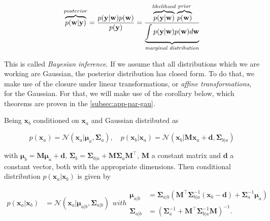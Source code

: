 \documentclass[11pt]{article} %
\begin{document}
\begin{equation}
   \overbrace{p(\mathbf{w}|\mathbf{y})}^{posterior} = \frac{p(\mathbf{y}|\mathbf{w}) p(\mathbf{w})}{p(\mathbf{y})} = \frac{\overbrace{p(\mathbf{y}|\mathbf{w})}^{\text{\textit{likelihood}}} \overbrace{p(\mathbf{w})}^{\text{\textit{prior}}}}{\underbrace{\int p(\mathbf{y}|\mathbf{w}) p(\mathbf{w}) d\mathbf{w}}_{\text{\textit{marginal distribution}}}}
\end{equation}

This is called \textit{Bayesian inference}. If we assume that all distributions which we are working are Gaussian, the posterior distribution has closed form. To do that, we make use of the closure under linear transformations, or \textit{affine transformations}, for the Gaussian. For that, we will make use of the corollary below, which theorems are proven in the \autoref{subsec:app-par-gau}.

\begin{corollary}

   Being $\mathbf{x}_b$ conditioned on $\mathbf{x}_a$ and Gaussian distributed as

   \begin{equation}
     p\left(\mathbf{x}_{a}\right)=\mathcal{N}\left(\mathbf{x}_{a} | \boldsymbol{\mu}_{a}, \boldsymbol{\Sigma}_{a}\right), \quad p\left(\mathbf{x}_{b} | \mathbf{x}_{a}\right)=\mathcal{N}\left(\mathbf{x}_{b} | \mathbf{M} \mathbf{x}_{a}+\mathbf{d}, \boldsymbol{\Sigma}_{b | a}\right)
   \end{equation}

   with $\boldsymbol{\mu}_{b} =\mathbf{M} \boldsymbol{\mu}_{a}+\mathbf{d}$, $\boldsymbol{\Sigma}_{b} =\boldsymbol{\Sigma}_{b | a}+\mathbf{M} \boldsymbol{\Sigma}_{a} \mathbf{M}^\top$, $\mathbf{M}$ a constant matrix and $\mathbf{d}$ a constant vector, both with the appropriate dimensions. Then conditional distribution $p(\mathbf{x}_a|\mathbf{x}_b)$ is given by

   \begin{subequations}
   
   \begin{align}
     p\left(\mathbf{x}_{a} | \mathbf{x}_{b}\right)&=\mathcal{N}\left(\mathbf{x}_{a} | \boldsymbol{\mu}_{a | b}, \boldsymbol{\Sigma}_{a | b}\right)
   \end{align}
   with
   \begin{align}
       \boldsymbol{\mu}_{a | b}&=\boldsymbol{\Sigma}_{a | b}\left(\mathbf{M}^\top \boldsymbol{\Sigma}_{b | a}^{-1}\left(\mathbf{x}_{b}-\mathbf{d}\right)+\boldsymbol{\Sigma}_{a}^{-1} \boldsymbol{\mu}_{a}\right) \\ \boldsymbol{\Sigma}_{a | b}&=\left(\boldsymbol{\Sigma}_{a}^{-1}+\mathbf{M}^\top \boldsymbol{\Sigma}_{b | a}^{-1} \mathbf{M}\right)^{-1}.
   \end{align}
 \end{subequations}
 \end{corollary}
\end{document}
